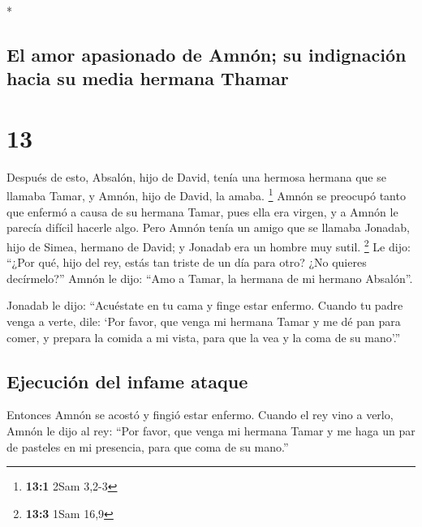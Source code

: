 \begin{paracol}{2}
\begin{otherlanguage}{english}
\end{otherlanguage}

\switchcolumn[0]*

\hypertarget{el-amor-apasionado-de-amnuxf3n-su-indignaciuxf3n-hacia-su-media-hermana-thamar}{%
\subsection{El amor apasionado de Amnón; su indignación hacia su media
hermana
Thamar}\label{el-amor-apasionado-de-amnuxf3n-su-indignaciuxf3n-hacia-su-media-hermana-thamar}}

\hypertarget{section-24}{%
\section{13}\label{section-24}}

 Después de esto, Absalón, hijo de David, tenía una
hermosa hermana que se llamaba Tamar, y Amnón, hijo de David, la amaba.
\footnote{\textbf{13:1} 2Sam 3,2-3}  Amnón se preocupó
tanto que enfermó a causa de su hermana Tamar, pues ella era virgen, y a
Amnón le parecía difícil hacerle algo.  Pero Amnón tenía
un amigo que se llamaba Jonadab, hijo de Simea, hermano de David; y
Jonadab era un hombre muy sutil. \footnote{\textbf{13:3} 1Sam 16,9}
 Le dijo: ``¿Por qué, hijo del rey, estás tan triste de un
día para otro? ¿No quieres decírmelo?'' Amnón le dijo: ``Amo a Tamar, la
hermana de mi hermano Absalón''.

 Jonadab le dijo: ``Acuéstate en tu cama y finge estar
enfermo. Cuando tu padre venga a verte, dile: `Por favor, que venga mi
hermana Tamar y me dé pan para comer, y prepara la comida a mi vista,
para que la vea y la coma de su mano'.''

\hypertarget{ejecuciuxf3n-del-infame-ataque}{%
\subsection{Ejecución del infame
ataque}\label{ejecuciuxf3n-del-infame-ataque}}

 Entonces Amnón se acostó y fingió estar enfermo. Cuando
el rey vino a verlo, Amnón le dijo al rey: ``Por favor, que venga mi
hermana Tamar y me haga un par de pasteles en mi presencia, para que
coma de su mano.''


\end{paracol}
